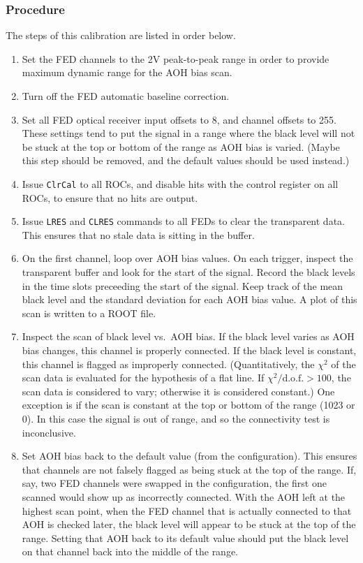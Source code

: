\subsubsection{Procedure}
The steps of this calibration are listed in order below.
\begin{enumerate}
\item Set the FED channels to the 2V peak-to-peak range in order to provide maximum dynamic range for the AOH bias scan.
\item Turn off the FED automatic baseline correction.
\item Set all FED optical receiver input offsets to 8, and channel offsets to 255.  These settings tend to put the signal in a range where the black level will not be stuck at the top or bottom of the range as AOH bias is varied.  (Maybe this step should be removed, and the default values should be used instead.)
\item Issue \verb|ClrCal| to all ROCs, and disable hits with the control register on all ROCs, to ensure that no hits are output.
\item Issue \verb|LRES| and \verb|CLRES| commands to all FEDs to clear the transparent data.  This ensures that no stale data is sitting in the buffer.
\item On the first channel, loop over AOH bias values.  On each trigger, inspect the transparent buffer and look for the start of the signal.  Record the black levels in the time slots preceeding the start of the signal.  Keep track of the mean black level and the standard deviation for each AOH bias value.  A plot of this scan is written to a ROOT file.
\item Inspect the scan of black level vs.~AOH bias.  If the black level varies as AOH bias changes, this channel is properly connected.  If the black level is constant, this channel is flagged as improperly connected.  (Quantitatively, the $\chi^2$ of the scan data is evaluated for the hypothesis of a flat line.  If $\chi^2/\mathrm{d.o.f.} > 100$, the scan data is considered to vary; otherwise it is considered constant.)  One exception is if the scan is constant at the top or bottom of the range (1023 or 0).  In this case the signal is out of range, and so the connectivity test is inconclusive.
\item Set AOH bias back to the default value (from the configuration).  This ensures that channels are not falsely flagged as being stuck at the top of the range.  If, say, two FED channels were swapped in the configuration, the first one scanned would show up as incorrectly connected.  With the AOH left at the highest scan point, when the FED channel that is actually connected to that AOH is checked later, the black level will appear to be stuck at the top of the range.  Setting that AOH back to its default value should put the black level on that channel back into the middle of the range.

\end{enumerate}
